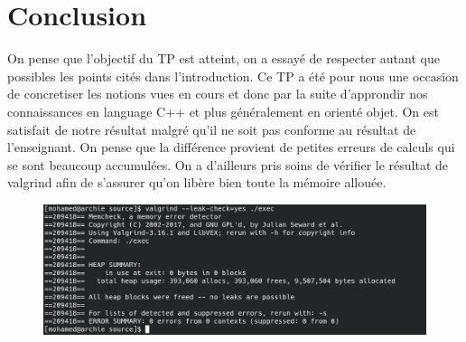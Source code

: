 \documentclass{article}
\begin{document}
\vspace{3cm}
\section*{Conclusion}
On pense que l'objectif du TP est atteint, on a essayé de respecter autant que
possibles les points cités dans l'introduction. Ce TP a été pour nous une
occasion de concretiser les notions vues en cours et donc par la suite
d'approndir nos connaissances en language C++ et plus généralement en orienté
objet.
On est satisfait de notre résultat malgré qu'il ne soit pas conforme au
résultat de l'enseignant. On pense que la différence provient de petites
erreurs de calculs qui se sont beaucoup accumulées.  On a d'ailleurs pris soins
de vérifier le résultat de valgrind afin de s'assurer qu'on libère bien toute
la mémoire allouée.

\begin{figure}[h]
\includegraphics[scale=0.5,width=350pt]{valgrind}
\end{figure}
\end{document}
